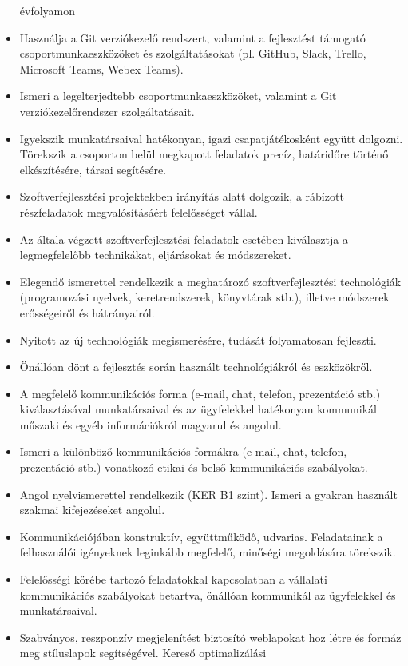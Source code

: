 \begin{itemize}
  évfolyamon
\item
  Használja a Git verziókezelő rendszert, valamint a fejlesztést
  támogató csoportmunkaeszközöket és szolgáltatásokat (pl. GitHub,
  Slack, Trello, Microsoft Teams, Webex Teams).
\item
  Ismeri a legelterjedtebb csoportmunkaeszközöket, valamint a Git
  verziókezelőrendszer szolgáltatásait.
\item
  Igyekszik munkatársaival hatékonyan, igazi csapatjátékosként együtt
  dolgozni. Törekszik a csoporton belül megkapott feladatok precíz,
  határidőre történő elkészítésére, társai segítésére.
\item
  Szoftverfejlesztési projektekben irányítás alatt dolgozik, a rábízott
  részfeladatok megvalósításáért felelősséget vállal.
\item
  Az általa végzett szoftverfejlesztési feladatok esetében kiválasztja a
  legmegfelelőbb technikákat, eljárásokat és módszereket.
\item
  Elegendő ismerettel rendelkezik a meghatározó szoftverfejlesztési
  technológiák (programozási nyelvek, keretrendszerek, könyvtárak stb.),
  illetve módszerek erősségeiről és hátrányairól.
\item
  Nyitott az új technológiák megismerésére, tudását folyamatosan
  fejleszti.
\item
  Önállóan dönt a fejlesztés során használt technológiákról és
  eszközökről.
\item
  A megfelelő kommunikációs forma (e-mail, chat, telefon, prezentáció
  stb.) kiválasztásával munkatársaival és az ügyfelekkel hatékonyan
  kommunikál műszaki és egyéb információkról magyarul és angolul.
\item
  Ismeri a különböző kommunikációs formákra (e-mail, chat, telefon,
  prezentáció stb.) vonatkozó etikai és belső kommunikációs szabályokat.
\item
  Angol nyelvismerettel rendelkezik (KER B1 szint). Ismeri a gyakran
  használt szakmai kifejezéseket angolul.
\item
  Kommunikációjában konstruktív, együttműködő, udvarias. Feladatainak a
  felhasználói igényeknek leginkább megfelelő, minőségi megoldására
  törekszik.
\item
  Felelősségi körébe tartozó feladatokkal kapcsolatban a vállalati
  kommunikációs szabályokat betartva, önállóan kommunikál az ügyfelekkel
  és munkatársaival.
\item
  Szabványos, reszponzív megjelenítést biztosító weblapokat hoz létre és
  formáz meg stíluslapok segítségével. Kereső optimalizálási

\end{itemize}
